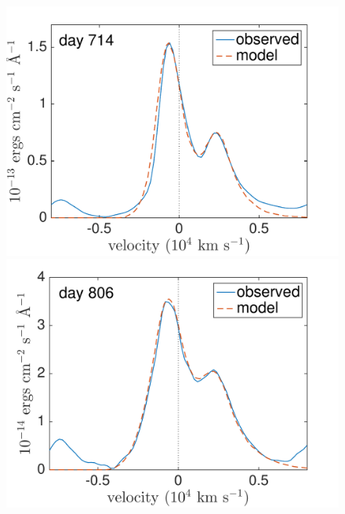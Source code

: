\begin{figure}
\centering
\includegraphics[trim =0 33 0 0,clip=true,scale=0.37]{chapters/chapter5/images/smooth/best_fit/d714OI.pdf}
\hspace{0mm}
\includegraphics[trim = 0 33 0 0,clip=true,scale=0.37]{chapters/chapter5/images/smooth/best_fit/d806OI_ext.pdf}


\end{figure}
